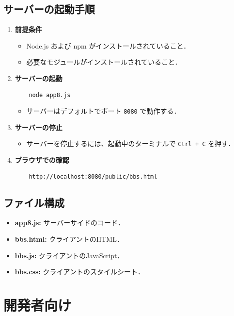 \documentclass[uplatex,dvipdfmx]{jsarticle}
\begin{document}
\subsection*{サーバーの起動手順}
\begin{enumerate}
  \item \textbf{前提条件}
    \begin{itemize}
      \item Node.js および npm がインストールされていること．
      \item 必要なモジュールがインストールされていること．
     \end{itemize}

  \item \textbf{サーバーの起動}
    \begin{verbatim}
    node app8.js
    \end{verbatim}
    \begin{itemize}
      \item サーバーはデフォルトでポート \texttt{8080} で動作する．
    \end{itemize}

  \item \textbf{サーバーの停止}
    \begin{itemize}
      \item サーバーを停止するには、起動中のターミナルで \texttt{Ctrl + C} を押す．
    \end{itemize}

  \item \textbf{ブラウザでの確認}
    \begin{verbatim}
    http://localhost:8080/public/bbs.html
    \end{verbatim}
\end{enumerate}

\subsection*{ファイル構成}
\begin{itemize}
  \item \textbf{app8.js:} サーバーサイドのコード．
  \item \textbf{bbs.html:} クライアントのHTML．
  \item \textbf{bbs.js:} クライアントのJavaScript．
  \item \textbf{bbs.css:} クライアントのスタイルシート．
\end{itemize}

\newpage

\section{開発者向け}
\end{document}
